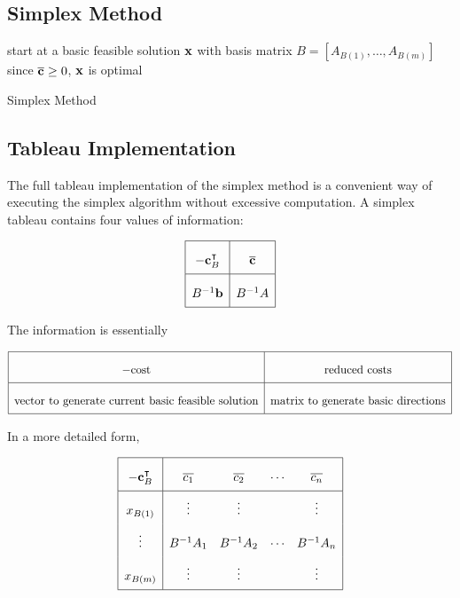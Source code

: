 \subsection{Simplex Method}
\begin{algorithm*}[H]
	\SetAlgoLined{}
	start at a basic feasible solution \(\vb x\) with basis matrix \(B = [A_{B(1)}, \dots, A_{B(m)}]\)\;
    since \( \overline{\vb c} \geq 0 \), \( \vb x \) is optimal
	\caption{Simplex Method}
\end{algorithm*}

\subsection{Tableau Implementation}
The full tableau implementation of the simplex method is a convenient way of executing the simplex algorithm without excessive computation.
A simplex tableau contains four values of information:

\[
\arraycolsep=5pt\def\arraystretch{2.2}
\begin{array}{|c|c|}\hline
    -\vb c_B^\transpose & \overline{\vb c} \\\hline
    B^{-1}\vb b & B^{-1}A \\\hline
\end{array}
\]

\noindent The information is essentially

\[
 \arraycolsep=5pt\def\arraystretch{2.2}
\begin{array}{|c|c|}
    \hline
    -\text{cost} & \text{reduced costs} \\\hline
    \text{vector to generate current basic feasible solution} & \text{matrix to generate basic directions} \\\hline
\end{array}
\]

\noindent In a more detailed form,

\[
\arraycolsep=5pt\def\arraystretch{2.2}
\begin{array}{|c|cccc|}\hline
    -\vb c_B^\transpose & \overline{c_1} & \overline{c_2} & \cdots & \overline{c_n} \\\hline
    x_{B(1)} & \vdots & \vdots & & \vdots \\
    \vdots & B^{-1} A_1 & B^{-1} A_2 & \cdots & B^{-1} A_n \\
    x_{B(m)} & \vdots & \vdots & & \vdots \\\hline
\end{array}
\]

